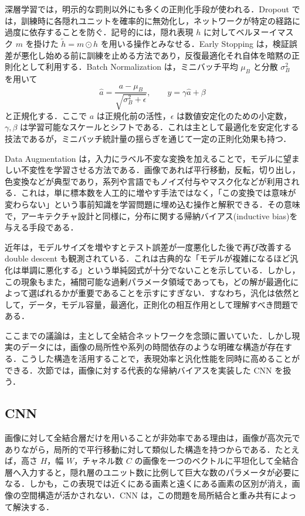 深層学習では，明示的な罰則以外にも多くの正則化手段が使われる．Dropout\cite{Srivastava2014} では，訓練時に各隠れユニットを確率的に無効化し，ネットワークが特定の経路に過度に依存することを防ぐ．記号的には，隠れ表現 $h$ に対してベルヌーイマスク $m$ を掛けた $\tilde h = m\odot h$ を用いる操作とみなせる．Early Stopping は，検証誤差が悪化し始める前に訓練を止める方法であり，反復最適化それ自体を暗黙の正則化として利用する．Batch Normalization\cite{Ioffe2015} は，ミニバッチ平均 $\mu_B$ と分散 $\sigma_B^2$ を用いて
\begin{equation}
\hat a = \frac{a-\mu_B}{\sqrt{\sigma_B^2+\epsilon}},
\qquad
y = \gamma \hat a + \beta
\end{equation}
と正規化する．ここで $a$ は正規化前の活性，$\epsilon$ は数値安定化のための小定数，$\gamma,\beta$ は学習可能なスケールとシフトである．これは主として最適化を安定化する技法であるが，ミニバッチ統計量の揺らぎを通じて一定の正則化効果も持つ．

Data Augmentation は，入力にラベル不変な変換を加えることで，モデルに望ましい不変性を学習させる方法である．画像であれば平行移動，反転，切り出し，色変換などが典型であり，系列や言語でもノイズ付与やマスク化などが利用される．これは，単に標本数を人工的に増やす手法ではなく，「この変換では意味が変わらない」という事前知識を学習問題に埋め込む操作と解釈できる．その意味で，アーキテクチャ設計と同様に，分布に関する帰納バイアス(inductive bias)を与える手段である．

近年は，モデルサイズを増やすとテスト誤差が一度悪化した後で再び改善する double descent も観測されている．これは古典的な「モデルが複雑になるほど汎化は単調に悪化する」という単純図式が十分でないことを示している．しかし，この現象もまた，補間可能な過剰パラメータ領域であっても，どの解が最適化によって選ばれるかが重要であることを示すにすぎない．すなわち，汎化は依然として，データ，モデル容量，最適化，正則化の相互作用として理解すべき問題である．

ここまでの議論は，主として全結合ネットワークを念頭に置いていた．しかし現実のデータには，画像の局所性や系列の時間依存のような明確な構造が存在する．こうした構造を活用することで，表現効率と汎化性能を同時に高めることができる．次節では，画像に対する代表的な帰納バイアスを実装した CNN を扱う．

\subsection{CNN}
画像に対して全結合層だけを用いることが非効率である理由は，画像が高次元でありながら，局所的で平行移動に対して類似した構造を持つからである．たとえば，高さ $H$，幅 $W$，チャネル数 $C$ の画像を一つのベクトルに平坦化して全結合層へ入力すると，隠れ層のユニット数に比例して巨大な数のパラメータが必要になる．しかも，この表現では近くにある画素と遠くにある画素の区別が消え，画像の空間構造が活かされない．CNN は，この問題を局所結合と重み共有によって解決する．

